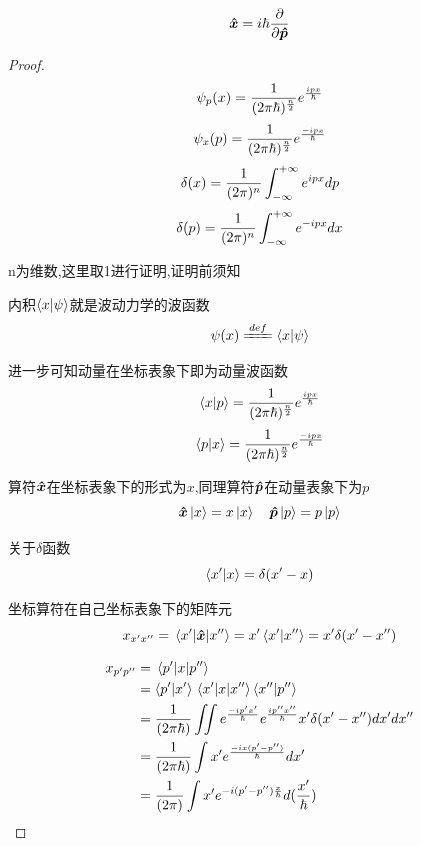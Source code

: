 \documentclass{article}
\begin{document}
            \begin{formal}
                $$ \vu*{x} = i\hbar \pdv{\vu*{p}}$$

                \begin{proof}
                    \pfindent
    
                    $$ \psi_{p} (x) = \frac{1}{(2 \pi \hbar)^{\frac{n}{2}}} e^{\frac{ipx}{\hbar}} $$ 
                    $$ \psi_{x} (p) = \frac{1}{(2 \pi \hbar)^{\frac{n}{2}}} e^{\frac{-ipx}{\hbar}} $$ 
                    $$ \delta(x) = \frac{1}{(2\pi)^{n}} \int_{-\infty}^{+\infty} e^{ipx} dp $$
                    $$ \delta(p) = \frac{1}{(2\pi)^{n}} \int_{-\infty}^{+\infty} e^{-ipx} dx $$
    
                    n为维数,这里取1进行证明,证明前须知
                    
                    内积$\braket{x}{\psi}$就是波动力学的波函数
                    $$\psi (x) \xlongequal{def} \braket{x}{\psi}$$
                    
                    进一步可知动量在坐标表象下即为动量波函数
                    $$ \braket{x}{p} = \frac{1}{(2 \pi \hbar)^{\frac{n}{2}}} e^{\frac{ipx}{\hbar}} $$
                    $$ \braket{p}{x} = \frac{1}{(2 \pi \hbar)^{\frac{n}{2}}} e^{\frac{-ipx}{\hbar}} $$
    
                    算符$\vu*{x}$在坐标表象下的形式为$x$,同理算符$\vu*{p}$在动量表象下为$p$
                    $${\vu*{x}} \ket{x}= x \ket{x} \quad {\vu*{p}} \ket{p} = p \ket{p} $$
    
                    关于$\delta$函数
                    $$ \braket{x'}{x} = \delta(x'-x) $$
    
                    坐标算符在自己坐标表象下的矩阵元
                    $$ x_{x'x''} = \mel{x'}{\vu*{x}}{x''} = x' \braket{x'}{x''} = x' \delta(x'-x'') $$
    
                    \begin{align*}
                        x_{p'p''} &= \mel{p'}{x}{p''} \\
                                &= \braket{p'}{x'} \mel{x'}{x}{x''} \braket{x''}{p''}                                                                  \\
                                &= \frac{1}{(2 \pi \hbar)} \iint e^{\frac{-ip' x'}{\hbar}}  e^{\frac{ip''x''}{\hbar}} x' \delta(x'-x'') dx'dx''          \\
                                &= \frac{1}{(2 \pi \hbar)} \int x' e^{\frac{-ix(p'-p'')}{\hbar}}   dx'                                                   \\
                                &= \frac{1}{(2 \pi)} \int x' e^{-i(p'-p'')\frac{x}{\hbar}}   d(\frac{x'}{\hbar})
                    \end{align*}
    

\end{proof}
\end{formal}
\end{document}

